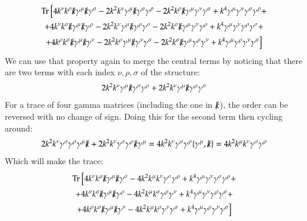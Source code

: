 \documentclass{article}
\begin{document}
\begin{equation}
\begin{gathered}
    \Tr \Big[
    4 k^\nu k^\rho \slashed{k}\gamma^\mu\slashed{k}\gamma^\sigma -
    2 k^2 k^\nu\gamma^\mu\slashed{k}\gamma^\sigma \gamma^\rho -
    2 k^2 k^\rho\slashed{k}\gamma^\mu \gamma^\nu\gamma^\sigma +
    k^4\gamma^\mu \gamma^\nu\gamma^\sigma \gamma^\rho + \\ +
    4 k^\nu k^\sigma \slashed{k}\gamma^\mu \slashed{k}\gamma^\rho -
    2 k^2 k^\nu \gamma^\mu \slashed{k}\gamma^\rho \gamma^\sigma -
    2 k^2 k^\sigma \slashed{k}\gamma^\mu \gamma^\nu\gamma^\rho +
    k^4\gamma^\mu \gamma^\nu \gamma^\rho \gamma^\sigma + \\ +
    4 k^\rho k^\sigma \slashed{k}\gamma^\mu \slashed{k}\gamma^\nu -
    2 k^2 k^\rho\gamma^\mu \slashed{k}\gamma^\nu \gamma^\sigma -
    2 k^2 k^\sigma \slashed{k}\gamma^\mu \gamma^\rho\gamma^\nu +
    k^4\gamma^\mu \gamma^\rho\gamma^\nu \gamma^\sigma \Big]
\end{gathered}
\end{equation}
We can use that property again to merge the central terms by noticing that there are two terms with each index $\nu, \rho, \sigma$ of the structure:
\begin{equation}
    2 k^2 k^\nu\gamma^\mu\slashed{k}\gamma^\sigma \gamma^\rho +
    2 k^2 k^\nu \gamma^\mu \slashed{k}\gamma^\rho \gamma^\sigma
\end{equation}
For a trace of four gamma matrices (including the one in $\slashed{k}$), the order can be reversed with no change of sign. Doing this for the second term then cycling around:
\begin{equation}
    2 k^2 k^\nu\gamma^\sigma\gamma^\rho\gamma^\mu\slashed{k} +
    2 k^2 k^\nu\gamma^\sigma\gamma^\rho\slashed{k}\gamma^\mu = 
    4 k^2 k^\nu\gamma^\sigma\gamma^\rho\{\gamma^\mu,\slashed{k}\} =
    4 k^2 k^\mu k^\nu\gamma^\sigma\gamma^\rho
\end{equation}
Which will make the trace:
\begin{equation}
\begin{gathered}
    \Tr \Big[
    4 k^\nu k^\rho \slashed{k}\gamma^\mu\slashed{k}\gamma^\sigma -
    4 k^2 k^\mu k^\nu\gamma^\sigma\gamma^\rho +
    k^4\gamma^\mu \gamma^\nu\gamma^\sigma \gamma^\rho + \\ +
    4 k^\nu k^\sigma \slashed{k}\gamma^\mu \slashed{k}\gamma^\rho -
    4 k^2 k^\mu k^\sigma \gamma^\rho\gamma^\nu +
    k^4\gamma^\mu \gamma^\nu \gamma^\rho \gamma^\sigma + \\ +
    4 k^\rho k^\sigma \slashed{k}\gamma^\mu \slashed{k}\gamma^\nu -
    4 k^2 k^\mu k^\rho \gamma^\nu\gamma^\sigma +
    k^4\gamma^\mu \gamma^\rho\gamma^\nu \gamma^\sigma \Big]
\end{gathered}
\end{equation}
\end{document}
